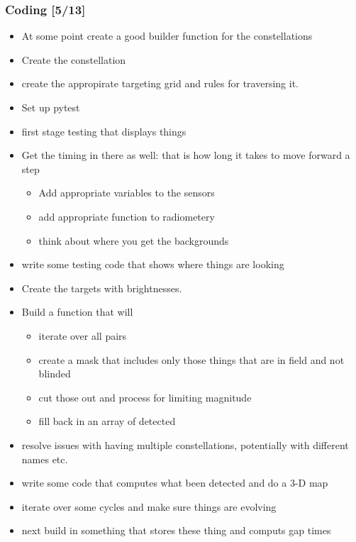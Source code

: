 \documentclass[11pt]{article}
\begin{document}
\subsubsection{Coding [5/13]}
\label{sec:org46475f3}
\begin{itemize}
\item[{$\boxtimes$}] At some point create a good builder function for the constellations
\item[{$\boxtimes$}] Create the constellation
\item[{$\boxtimes$}] create the appropirate targeting grid and rules for traversing it.
\item[{$\boxtimes$}] Set up pytest
\item[{$\boxtimes$}] first stage testing that displays things
\item[{$\square$}] Get the timing in there as well: that is how long it takes to move
forward a step
\begin{itemize}
\item[{$\square$}] Add appropriate variables to the sensors
\item[{$\square$}] add appropriate function to radiometery
\item[{$\square$}] think about where you get the backgrounds
\end{itemize}

\item[{$\square$}] write some testing code that shows where things are looking
\item[{$\square$}] Create the targets with brightnesses.
\item[{$\square$}] Build a function that will
\begin{itemize}
\item[{$\square$}] iterate over all pairs
\item[{$\square$}] create a mask that includes only those things that are in field and
not blinded
\item[{$\square$}] cut those out and process for limiting magnitude
\item[{$\square$}] fill back in an array of detected
\end{itemize}
\item[{$\square$}] resolve issues with having multiple constellations, potentially with
different names etc.
\item[{$\square$}] write some code that computes what been detected and do a 3-D map
\item[{$\square$}] iterate over some cycles and make sure things are evolving
\item[{$\square$}] next build in something that stores these thing and computs gap times
\end{itemize}
\end{document}
